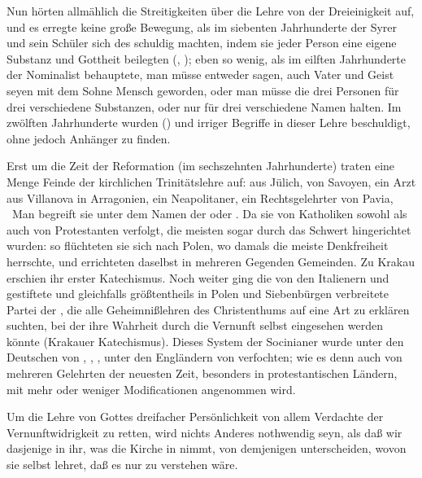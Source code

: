 \begin{aufza}
\item Nun hörten allmählich die Streitigkeiten über die Lehre von der Dreieinigkeit auf, und es erregte keine große Bewegung, als im siebenten Jahrhunderte der Syrer  und sein Schüler  sich des  schuldig machten, indem sie jeder Person eine eigene Substanz und Gottheit beilegten (, ); eben so wenig, als im eilften Jahrhunderte der Nominalist  behauptete, man müsse entweder sagen, auch Vater und Geist seyen mit dem Sohne Mensch geworden, oder man müsse die drei Personen für drei verschiedene Substanzen, oder nur für drei verschiedene Namen halten. Im zwölften Jahrhunderte wurden () und  irriger Begriffe in dieser Lehre beschuldigt, ohne jedoch Anhänger zu finden.
\item Erst um die Zeit der Reformation (im sechszehnten Jahrhunderte) traten eine Menge Feinde der kirchlichen Trinitätslehre auf:  aus Jülich,  von Savoyen,  ein Arzt aus Villanova in Arragonien,  ein Neapolitaner,  ein Rechtsgelehrter von Pavia, \umA\  Man begreift sie unter dem Namen der  oder . Da sie von Katholiken sowohl als auch von Protestanten verfolgt, die meisten sogar durch das Schwert hingerichtet wurden: so flüchteten sie sich nach Polen, wo damals die meiste Denkfreiheit herrschte, und errichteten daselbst in mehreren Gegenden Gemeinden. Zu Krakau erschien ihr erster Katechismus. Noch weiter ging die von den Italienern  und  gestiftete und gleichfalls größtentheils in Polen und Siebenbürgen verbreitete Partei der , die alle Geheimnißlehren des Christenthums auf eine Art zu erklären suchten, bei der ihre Wahrheit durch die Vernunft selbst eingesehen werden könnte (Krakauer Katechismus). Dieses System der Socinianer wurde unter den Deutschen von , , , unter den Engländern von  verfochten; wie es denn auch von mehreren Gelehrten der neuesten Zeit, besonders in protestantischen Ländern, mit mehr oder weniger Modificationen angenommen wird.
\end{aufza}

Um die Lehre von Gottes dreifacher Persönlichkeit von allem Verdachte der Vernunftwidrigkeit zu retten, wird nichts Anderes nothwendig seyn, als daß wir dasjenige in ihr, was die Kirche in  nimmt, von demjenigen unterscheiden, wovon sie selbst lehret, daß es nur  zu verstehen wäre.~\par

